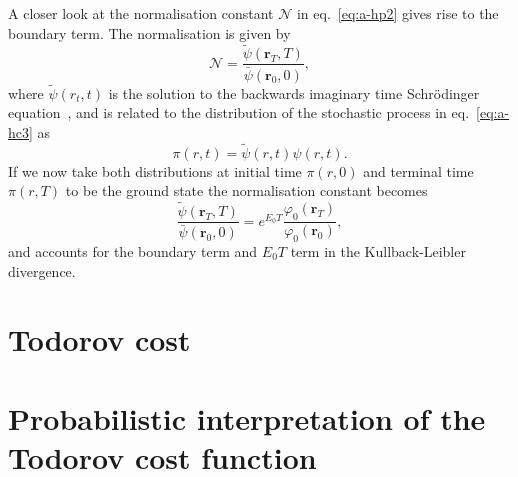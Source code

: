 A closer look at the normalisation constant $\mathcal{N}$ in eq.~\eqref{eq:a-hp2} gives rise to the boundary term. The normalisation is given by
\begin{equation}
	\mathcal N = \frac{\tilde{\psi}\left(\boldsymbol{r}_{T}, T\right)}{\bar{\psi}\left(\boldsymbol{r}_{0}, 0\right)},
\end{equation}
where $\tilde{\psi}\left(r_{t}, t\right)$ is the solution to the backwards imaginary time Schr\" odinger equation~\cite{barr2020quantum}, and is related to the distribution of the stochastic process in eq.~\eqref{eq:a-hc3} as
\begin{equation}
	\pi(r, t) = \tilde{\psi}\left(r, t\right) \psi\left(r, t\right).
\end{equation}
If we now take both distributions at initial time $\pi(r, 0)$ and terminal time $\pi(r, T)$ to be the ground state the normalisation constant becomes
\begin{equation}
	\frac{\tilde{\psi}\left(\boldsymbol{r}_{T}, T\right)}{\bar{\psi}\left(\boldsymbol{r}_{0}, 0\right)} = e^{E_{0} T} \frac{\varphi_{0}\left(\boldsymbol{r}_{T}\right)}{\varphi_{0}\left(\boldsymbol{r}_{0}\right)},
\end{equation}
and accounts for the boundary term and $E_0 T$ term in the Kullback-Leibler divergence.


\newpage 
\section{Todorov cost}

\section{Probabilistic interpretation of the Todorov cost function}